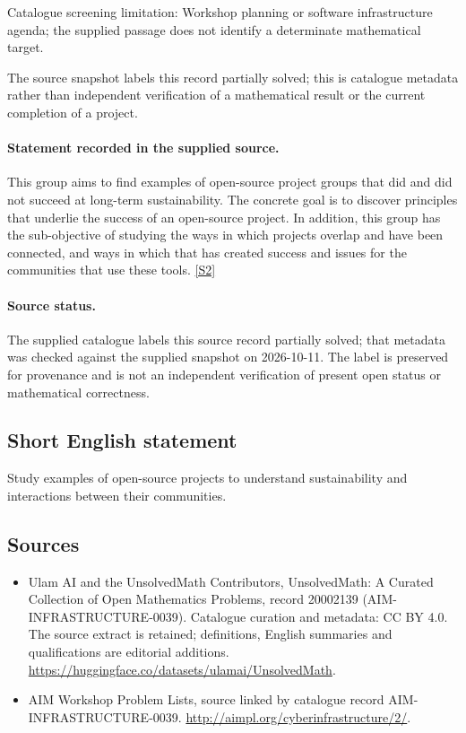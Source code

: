 \documentclass[11pt]{article}
\begin{document}
Catalogue screening limitation: Workshop planning or software infrastructure agenda; the supplied passage does not identify a determinate mathematical target.

The source snapshot labels this record partially solved; this is catalogue metadata rather than independent verification of a mathematical result or the current completion of a project.
\paragraph{Statement recorded in the supplied source.}
This group aims to find examples of open-source project groups that did and did not succeed at long-term sustainability. The concrete goal is to discover principles that underlie the success of an open-source project. In addition, this group has the sub-objective of studying the ways in which projects overlap and have been connected, and ways in which that has created success and issues for the communities that use these tools. \href{http://aimpl.org/cyberinfrastructure/2/}{[S2]}
\paragraph{Source status.}
The supplied catalogue labels this source record partially solved; that metadata was checked against the supplied snapshot on 2026-10-11. The label is preserved for provenance and is not an independent verification of present open status or mathematical correctness.
\subsection{Short English statement}
Study examples of open-source projects to understand sustainability and interactions between their communities.
\subsection{Sources}
\begin{itemize}
\item[S1] Ulam AI and the UnsolvedMath Contributors, UnsolvedMath: A Curated Collection of Open Mathematics Problems, record 20002139 (AIM-INFRASTRUCTURE-0039). Catalogue curation and metadata: CC BY 4.0. The source extract is retained; definitions, English summaries and qualifications are editorial additions.
\url{https://huggingface.co/datasets/ulamai/UnsolvedMath}.
\item[S2] AIM Workshop Problem Lists, source linked by catalogue record AIM-INFRASTRUCTURE-0039.
\url{http://aimpl.org/cyberinfrastructure/2/}.
\end{itemize}
\end{document}
